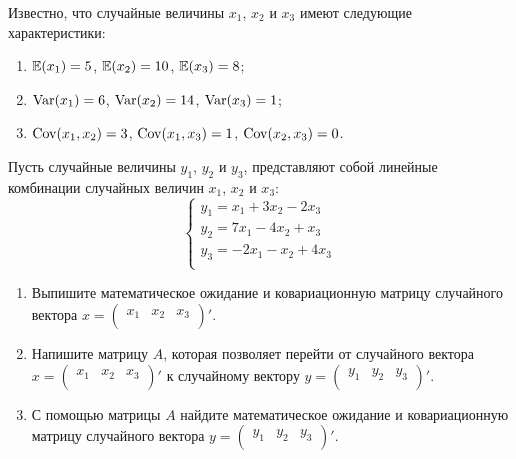 \begin{problem}
Известно, что случайные величины $x_1$, $x_2$ и $x_3$ имеют следующие характеристики:
\begin{enumerate}
\item $\mathbb{E}(x_1) = 5$, $\mathbb{E}(x_2) = 10$, $\mathbb{E}(x_3) = 8$;
\item $\operatorname{Var}  (x_1) = 6$, $\operatorname{Var}  (x_2) = 14$, $\operatorname{Var}  (x_3) = 1$;
\item $\operatorname{Cov}  (x_1, x_2) = 3$, $\operatorname{Cov}  (x_1, x_3) = 1$, $\operatorname{Cov}  (x_2, x_3) = 0$.
\end{enumerate}
Пусть случайные величины $y_1$, $y_2$ и $y_3$, представляют собой линейные комбинации случайных величин $x_1$, $x_2$ и $x_3$:
\[
\begin{cases}
y_1 = x_1 + 3x_2 - 2x_3 \\
y_2 = 7x_1 - 4x_2 + x_3 \\
y_3 = -2x_1 - x_2 + 4x_3 \\
\end{cases}
\]

\begin{enumerate}
\item Выпишите математическое ожидание и ковариационную матрицу случайного вектора $x =  \begin{pmatrix}
x_1 & x_2 & x_3\\
\end{pmatrix} '$.
\item Напишите матрицу $A$, которая позволяет перейти от случайного вектора $x =  \begin{pmatrix}
x_1 & x_2 & x_3\\
\end{pmatrix} '$ к случайному вектору $y =  \begin{pmatrix}
y_1 & y_2 & y_3\\
\end{pmatrix} '$.
\item С помощью матрицы $A$ найдите математическое ожидание и ковариационную матрицу случайного вектора $y =  \begin{pmatrix}
y_1 & y_2 & y_3\\
\end{pmatrix} '$.
\end{enumerate}


\begin{sol}
\end{sol}
\end{problem}






